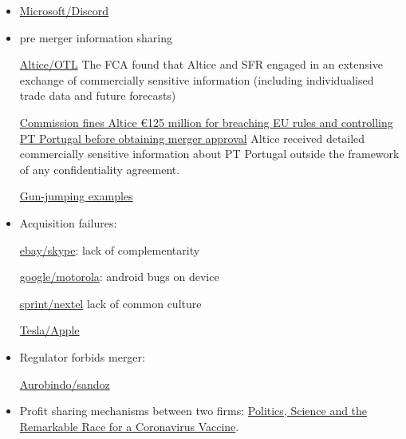 \documentclass[a4paper,leqno]{article}%
\begin{document}
\begin{itemize}
    \item \href{https://www.lemonde.fr/economie/article/2021/04/08/microsoft-convoite-le-service-de-discussion-discord_6076070_3234.html}{Microsoft/Discord}
    \item pre merger information sharing
    
    \href{https://sites-herbertsmithfreehills.vuturevx.com/46/12874/compose-email/the-altice-case-a-costly-warning-not-to-engage-in-gun-jumping-before-receiving-merger-control-clearance.asp}{Altice/OTL} The FCA found that Altice and SFR engaged in an extensive exchange of commercially sensitive information (including individualised trade data and future forecasts)
    
    \href{https://ec.europa.eu/commission/presscorner/detail/en/IP_18_3522}{Commission fines Altice €125 million for breaching EU rules and controlling PT Portugal before obtaining merger approval} Altice received detailed commercially sensitive information about PT Portugal outside the framework of any confidentiality agreement.
    
    \href{https://www.twobirds.com/en/news/articles/2020/global/double-caution-gun-jumping-risks-in-m-and-a-transactions}{Gun-jumping examples}
    \item Acquisition failures:
    
    \href{https://www.investopedia.com/articles/insights/061816/4-cases-when-ma-strategy-failed-acquirer-ebay-bac.asp}{ebay/skype}: lack of complementarity
    
    \href{https://salessynergy.net/the-biggest-acquisition-disasters-that-put-companies-into-quite-a-bit-of-trouble/}{google/motorola}: android bugs on device
    
    \href{https://www.investopedia.com/articles/financial-theory/08/merger-acquisition-disasters.asp#:~:text=The\%20consolidation\%20of\%20AOL\%20Time,combination\%20up\%20until\%20that\%20time}{sprint/nextel} lack of common culture
    
    \href{https://www.theguardian.com/technology/2020/dec/23/elon-musk-i-tried-to-sell-tesla-to-apple?CMP=Share_iOSApp_Other}{Tesla/Apple}

    
    \item Regulator forbids merger:
    
    \href{https://www.livemint.com/companies/news/aurobindo-pharma-calls-off-1-billion-deal-with-sandoz-after-failing-to-get-ftc-nod-11585801128011.html}{Aurobindo/sandoz}
    
    \item Profit sharing mechanisms between two firms: \href{https://www.nytimes.com/2020/11/21/us/politics/coronavirus-vaccine.html?referringSource=articleShare}{Politics, Science and the Remarkable Race for a Coronavirus Vaccine}.
\end{itemize}
\end{document}
